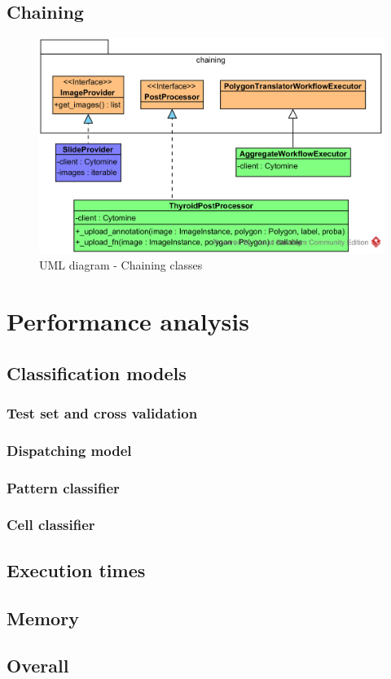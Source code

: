 \subsection{Chaining}

\begin{figure}
	\center
	\includegraphics[scale=0.85]{image/thyroid_image_provider.png}
	\caption{UML diagram - Chaining classes}
	\label{fig:uml_cyto_chaining}
\end{figure}


\section{Performance analysis}
\label{sec:thyroid_perf}

\subsection{Classification models}
\label{ssec:thyroid_perf_models}
\subsubsection{Test set and cross validation}
\subsubsection{Dispatching model}
\subsubsection{Pattern classifier}
\subsubsection{Cell classifier}

\subsection{Execution times}

\subsection{Memory}

\subsection{Overall}